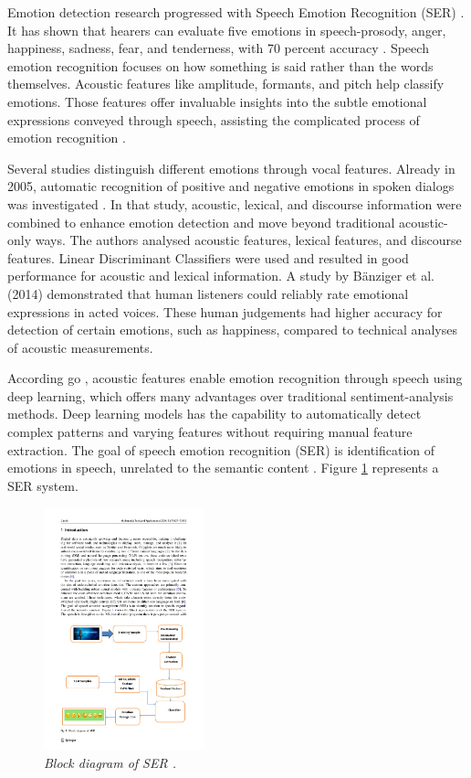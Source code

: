 Emotion detection research progressed with Speech Emotion Recognition (SER) \autocite{Kusal2023}. It has shown that hearers can evaluate five emotions in speech-prosody, anger, happiness, sadness, fear, and tenderness, with 70 percent accuracy \autocite{Oatley2019}. Speech emotion recognition focuses on how something is said rather than the words themselves. Acoustic features like amplitude, formants, and pitch help classify emotions. Those features offer invaluable insights into the subtle emotional expressions conveyed through speech, assisting the complicated process of emotion recognition \autocite{Lian2023}.

Several studies distinguish different emotions through vocal features. Already in 2005, automatic recognition of positive and negative emotions in spoken dialogs was investigated \autocite{ChulMinLee2005}. In that study, acoustic, lexical, and discourse information were combined to enhance emotion detection and move beyond traditional acoustic-only ways. The authors analysed acoustic features, lexical features, and discourse features. Linear Discriminant Classifiers were used and resulted in good performance for acoustic and lexical information. A study by Bänziger et al. (2014) demonstrated that human listeners could reliably rate emotional expressions in acted voices. These human judgements had higher accuracy for detection of certain emotions, such as happiness, compared to technical analyses of acoustic measurements. 

According go \textcite{Khalil2019}, acoustic features enable emotion recognition through speech using deep learning, which offers many advantages over traditional sentiment-analysis methods. Deep learning models has the capability to automatically detect complex patterns and varying features without requiring manual feature extraction. The goal of speech emotion recognition (SER) is identification of emotions in speech, unrelated to the semantic content \autocite{Kusal2024}. Figure \ref{fig:blockdiagram-SER} represents a SER system.

\begin{figure}[ht]
    \centering
    \includegraphics[height=7cm]{png/background/block-diagram.pdf}
    \caption{\textit{Block diagram of SER \autocite{Tyagi2024}.}}
    \label{fig:blockdiagram-SER}
\end{figure}

